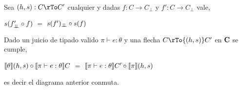 \

\begin{proposition}
Sea $(h,s) : C \rTo C'$ cualquier y dadas $f : C \rightarrow C_\bot$ y 
$f' : C \rightarrow C_\bot$ vale,

\begin{center}
$s(f'_{\bot \!\!\! \bot} \circ f)$ $=$ $s(f')_{\bot \!\!\! \bot} \circ s(f)$
\end{center}

\end{proposition}

\begin{theorem}[de naturalidad]
Dado un juicio de tipado valido $\pi \vdash e : \theta$ y una flecha 
$C \rTo{(h,s)} C'$ en $\textbf{C}$ se cumple,
\begin{center}
$\llbracket \theta \rrbracket(h,s) \circ \llbracket \pi \vdash e : \theta \rrbracket C$ $=$
$\llbracket \pi \vdash e : \theta \rrbracket C' \circ \llbracket \pi \rrbracket(h,s)$
\end{center}
es decir el diagrama anterior conmuta.

\end{theorem}

